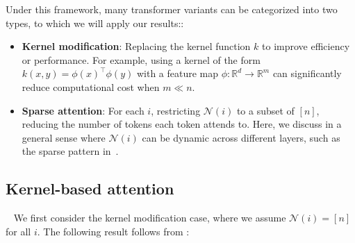 \documentclass{article}
\newcommand{\lt}[1]{{\footnotesize\textcolor{cyan!60!black}{\tt TL: #1}}}
\begin{document}
Under this framework, many transformer variants can be categorized into two types, to which we will apply our results::
\begin{itemize}
    \item \textbf{Kernel modification}: Replacing the kernel function $k$ to improve efficiency or performance. For example, using a kernel of the form $k(x,y)= \phi(x)^\top\phi(y)$ with a feature map $\phi:\mathbb{R}^d\to\mathbb{R}^m$ can significantly reduce computational cost when $m\ll n$.
    \item \textbf{Sparse attention}: For each $i$, restricting $\mathcal N(i)$ to a subset of $[n]$, reducing the number of tokens each token attends to. Here, we discuss in a general sense where $\mathcal N(i)$ can be dynamic across different layers, such as the sparse pattern in~\cite{zaheer2020big,kitaev2020reformer}. 
\end{itemize}


\subsection{Kernel-based attention}
~\label{sec:kernel_atten}
We first consider the kernel modification case, where we assume $\mathcal N(i)=[n]$ for all $i$. The following result follows from :
\end{document}
